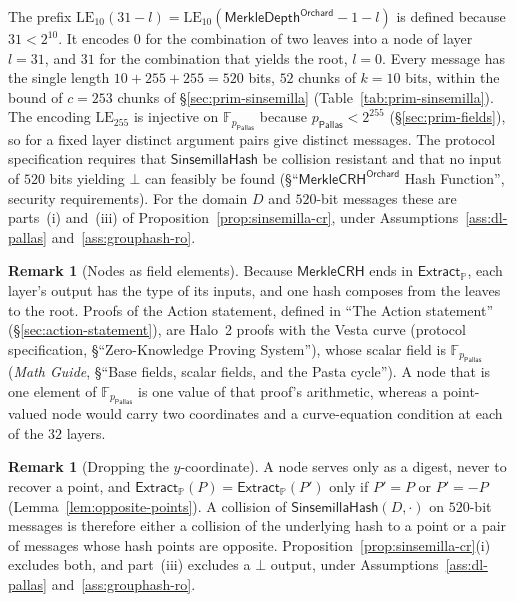 \documentclass[11pt,a4paper]{article}
\theoremstyle{definition}
\newtheorem{remark}[theorem]{Remark}
\newcommand{\F}{\mathbb{F}}
\newcommand{\PP}{\mathbb{P}}
\newcommand{\Pallas}{\ensuremath{\mathsf{Pallas}}}
\newcommand{\Extract}{\ensuremath{\mathsf{Extract}}}
\begin{document}
The prefix $\mathrm{LE}_{10}(31 - l) = \mathrm{LE}_{10}(
\mathsf{MerkleDepth}^{\mathsf{Orchard}} - 1 - l)$ is defined because
$31 < 2^{10}$. It encodes $0$ for the combination of two leaves into a node
of layer $l = 31$, and $31$ for the combination that yields the root,
$l = 0$. Every message has the single length $10 + 255 + 255 = 520$ bits,
$52$ chunks of $k = 10$ bits, within the bound of $c = 253$ chunks of
\S\ref{sec:prim-sinsemilla} (Table~\ref{tab:prim-sinsemilla}). The encoding
$\mathrm{LE}_{255}$ is injective on $\F_{p_{\Pallas}}$ because
$p_{\Pallas} < 2^{255}$ (\S\ref{sec:prim-fields}), so for a fixed layer
distinct argument pairs give distinct messages. The protocol specification
requires that $\mathsf{SinsemillaHash}$ be collision resistant and that no
input of $520$ bits yielding $\bot$ can feasibly be found
(\S``$\mathsf{MerkleCRH}^{\mathsf{Orchard}}$ Hash Function'', security
requirements). For the domain $D$ and $520$-bit messages these are parts~(i)
and~(iii) of Proposition~\ref{prop:sinsemilla-cr}, under
Assumptions~\ref{ass:dl-pallas} and~\ref{ass:grouphash-ro}.

\begin{remark}[Nodes as field elements]
Because $\mathsf{MerkleCRH}$ ends in $\Extract_{\PP}$, each layer's output
has the type of its inputs, and one hash composes from the leaves to the
root. Proofs of the Action statement, defined in ``The Action statement''
(\S\ref{sec:action-statement}), are Halo~2 proofs with the Vesta curve
(protocol specification, \S``Zero-Knowledge Proving System''), whose scalar
field is $\F_{p_{\Pallas}}$ (\emph{Math Guide}, \S``Base fields, scalar
fields, and the Pasta cycle''). A node that is one element of
$\F_{p_{\Pallas}}$ is one value of that proof's arithmetic, whereas a
point-valued node would carry two coordinates and a curve-equation condition
at each of the $32$ layers.
\end{remark}

\begin{remark}[Dropping the $y$-coordinate]
A node serves only as a digest, never to recover a point, and
$\Extract_{\PP}(P) = \Extract_{\PP}(P')$ only if $P' = P$ or $P' = -P$
(Lemma~\ref{lem:opposite-points}). A collision of
$\mathsf{SinsemillaHash}(D, \cdot)$ on $520$-bit messages is therefore either
a collision of the underlying hash to a point or a pair of messages whose
hash points are opposite. Proposition~\ref{prop:sinsemilla-cr}(i) excludes
both, and part~(iii) excludes a $\bot$ output, under
Assumptions~\ref{ass:dl-pallas} and~\ref{ass:grouphash-ro}.
\end{remark}
\end{document}
